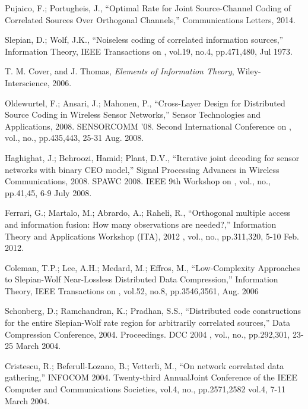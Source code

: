\documentclass[journal]{IEEEtran}
\begin{document}
\begin{thebibliography}{99}

 Pujaico, F.; Portugheis, J.,
``Optimal Rate for Joint Source-Channel Coding of Correlated Sources Over 
Orthogonal Channels,'' Communications Letters, 2014.

 Slepian, D.; Wolf, J.K., 
``Noiseless coding of correlated information sources,'' 
Information Theory, IEEE Transactions on , vol.19, no.4, pp.471,480, Jul 1973.

T. M. Cover, and J. Thomas, \textit{Elements of Information Theory}, Wiley-Interscience, 2006.

 Oldewurtel, F.; Ansari, J.; Mahonen, P., 
``Cross-Layer Design for Distributed Source Coding in Wireless Sensor Networks,'' 
Sensor Technologies and Applications, 2008. SENSORCOMM '08. Second International 
Conference on , vol., no., pp.435,443, 25-31 Aug. 2008.

 Haghighat, J.; Behroozi, Hamid; Plant, D.V., 
``Iterative joint decoding for sensor networks with binary CEO model,'' 
Signal Processing Advances in Wireless Communications, 2008. SPAWC 2008. 
IEEE 9th Workshop on , vol., no., pp.41,45, 6-9 July 2008.

 Ferrari, G.; Martalo, M.; Abrardo, A.; Raheli, R., 
``Orthogonal multiple access and information fusion: How many observations are needed?,'' 
Information Theory and Applications Workshop (ITA), 2012 , vol., no., pp.311,320, 5-10 Feb. 2012.


Coleman, T.P.; Lee, A.H.; Medard, M.; Effros, M., ``Low-Complexity Approaches to Slepian-Wolf 
Near-Lossless Distributed Data Compression,'' 
Information Theory, IEEE Transactions on , vol.52, no.8, pp.3546,3561, Aug. 2006

Schonberg, D.; Ramchandran, K.; Pradhan, S.S., 
``Distributed code constructions for the entire Slepian-Wolf rate region for arbitrarily correlated sources,'' 
Data Compression Conference, 2004. Proceedings. DCC 2004 , vol., no., pp.292,301, 23-25 March 2004.

Cristescu, R.; Beferull-Lozano, B.; Vetterli, M., ``On network correlated data gathering,'' 
INFOCOM 2004. Twenty-third AnnualJoint Conference of the IEEE Computer and Communications Societies, 
vol.4, no., pp.2571,2582 vol.4, 7-11 March 2004.


\end{thebibliography}
\end{document}
